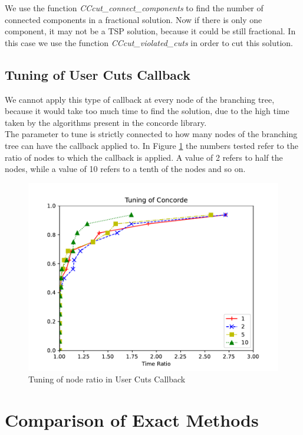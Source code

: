 We use the function \textit{CCcut\_connect\_components} to find the number of connected components in a fractional solution. Now if there is only one component, it may not be a TSP solution, because it could be still fractional. In this case we use the function \textit{CCcut\_violated\_cuts} in order to cut this solution.\\


\subsection{Tuning of User Cuts Callback}
We cannot apply this type of callback at every node of the branching tree, because it would take too much time to find the solution, due to the high time taken by the algorithms present in the concorde library.\\
The parameter to tune is strictly connected to how many nodes of the branching tree can have the callback applied to.
In Figure \ref{fig:concorde} the numbers tested refer to the ratio of nodes to which the callback is applied. A value of 2 refers to half the nodes, while a value of 10 refers to a tenth of the nodes and so on.

\begin{figure}[!h]
    \centering
    \includegraphics[width=\textwidth]{images/concorde.pdf}
    \caption{Tuning of node ratio in User Cuts Callback}
    \label{fig:concorde}
\end{figure}

\section{Comparison of Exact Methods}

